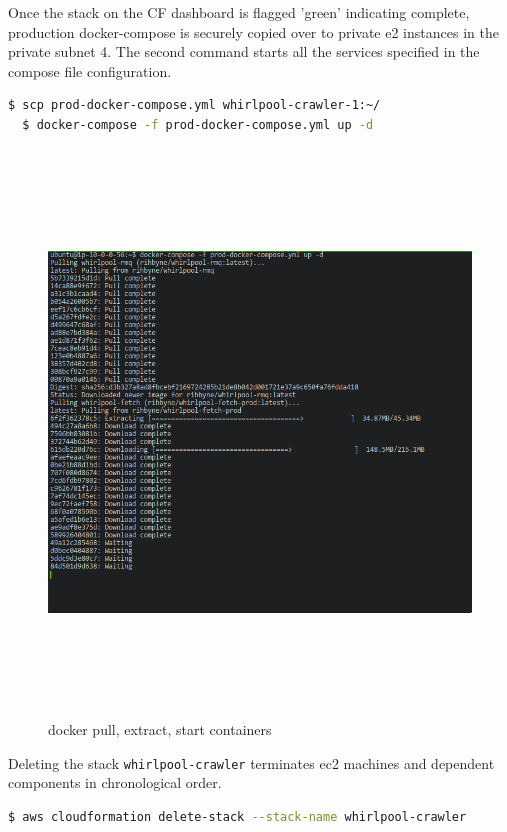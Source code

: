 \pagebreak

\noindent
Once the stack on the CF dashboard is flagged 'green' indicating complete, production docker-compose is 
securely copied over to private e2 instances in the private subnet 4. The second command starts all
the services specified in the compose file configuration.

\begin{lstlisting}[language=bash]
  $ scp prod-docker-compose.yml whirlpool-crawler-1:~/
  $ docker-compose -f prod-docker-compose.yml up -d
\end{lstlisting}

\begin{figure}[h!]
  \centering
  \includegraphics[width=15cm,height=15cm,keepaspectratio]{../media/crawler/docker-pull-prod.png}
  \caption{docker pull, extract, start containers}
  \label{fig:dockerpull}
\end{figure}

\noindent
Deleting the stack \texttt{whirlpool-crawler} terminates ec2 machines and dependent components in 
chronological order.

\begin{lstlisting}[language=bash]
  $ aws cloudformation delete-stack --stack-name whirlpool-crawler
\end{lstlisting}

\pagebreak